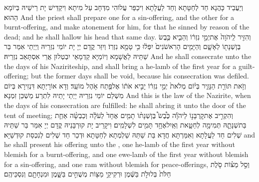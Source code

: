 {וְיַעֲבֵיד כָּהֲנָא חַד לְחַטָּתָא וְחַד לַעֲלָתָא וִיכַפַּר עֲלוֹהִי מִדְּחָב עַל מִיתָא וִיקַדֵּישׁ יָת רֵישֵׁיהּ בְּיוֹמָא הַהוּא׃}
{And the priest shall prepare one for a sin-offering, and the other for a burnt-offering, and make atonement for him, for that he sinned by reason of the dead; and he shall hallow his head that same day.}{}
{וְהִזִּ֤יר לַֽיהֹוָה֙ אֶת\maqqaf יְמֵ֣י נִזְר֔וֹ וְהֵבִ֛יא כֶּ֥בֶשׂ בֶּן\maqqaf שְׁנָת֖וֹ לְאָשָׁ֑ם וְהַיָּמִ֤ים הָרִאשֹׁנִים֙ יִפְּל֔וּ כִּ֥י טָמֵ֖א נִזְרֽוֹ׃}
{וְיִזַּר קֳדָם יְיָ יָת יוֹמֵי נִזְרֵיהּ וְיַיְתֵי אִמַּר בַּר שַׁתֵּיהּ לַאֲשָׁמָא וְיוֹמַיָּא קַדְמָאֵי יִבְטְלוּן אֲרֵי אִסְתָּאַב נִזְרֵיהּ׃}
{And he shall consecrate unto the \lord\space the days of his Naziriteship, and shall bring a he-lamb of the first year for a guilt-offering; but the former days shall be void, because his consecration was defiled.}{}
{וְזֹ֥את תּוֹרַ֖ת הַנָּזִ֑יר בְּי֗וֹם מְלֹאת֙ יְמֵ֣י נִזְר֔וֹ יָבִ֣יא אֹת֔וֹ אֶל\maqqaf פֶּ֖תַח אֹ֥הֶל מוֹעֵֽד׃}
{וְדָא אוֹרָיְתָא דִּנְזִירָא בְּיוֹם מִשְׁלַם יוֹמֵי נִזְרֵיהּ יַיְתֵי יָתֵיהּ לִתְרַע מַשְׁכַּן זִמְנָא׃}
{And this is the law of the Nazirite, when the days of his consecration are fulfilled: he shall abring it unto the door of the tent of meeting;}{}
{וְהִקְרִ֣יב אֶת\maqqaf קׇרְבָּנ֣וֹ לַיהֹוָ֡ה כֶּ֩בֶשׂ֩ בֶּן\maqqaf שְׁנָת֨וֹ תָמִ֤ים אֶחָד֙ לְעֹלָ֔ה וְכַבְשָׂ֨ה אַחַ֧ת בַּת\maqqaf שְׁנָתָ֛הּ תְּמִימָ֖ה לְחַטָּ֑את וְאַֽיִל\maqqaf אֶחָ֥ד תָּמִ֖ים לִשְׁלָמִֽים׃}
{וִיקָרֵיב יָת קוּרְבָּנֵיהּ קֳדָם יְיָ אִמַּר בַּר שַׁתֵּיהּ שְׁלִים חַד לַעֲלָתָא וְאִמַּרְתָּא חֲדָא בַּת שַׁתַּהּ שַׁלְמְתָא לְחַטָּתָא וּדְכַר חַד שְׁלִים לְנִכְסַת קוּדְשַׁיָּא׃}
{and he shall present his offering unto the \lord, one he-lamb of the first year without blemish for a burnt-offering, and one ewe-lamb of the first year without blemish for a sin-offering, and one ram without blemish for peace-offerings,}{}
{וְסַ֣ל מַצּ֗וֹת סֹ֤לֶת חַלֹּת֙ בְּלוּלֹ֣ת בַּשֶּׁ֔מֶן וּרְקִיקֵ֥י מַצּ֖וֹת מְשֻׁחִ֣ים בַּשָּׁ֑מֶן וּמִנְחָתָ֖ם וְנִסְכֵּיהֶֽם׃}
